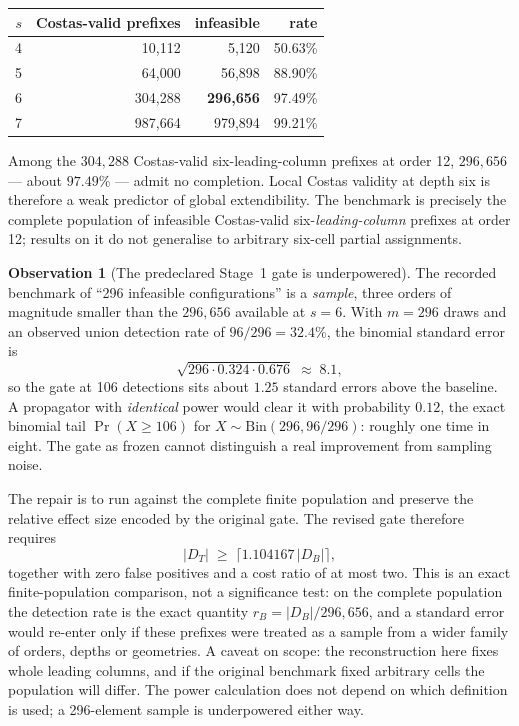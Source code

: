 \documentclass[11pt,a4paper,oneside]{report}
\theoremstyle{definition}
\newtheorem{observation}[theorem]{Observation}
\begin{document}
\begin{center}
\begin{tabular}{@{}rrrr@{}}
\toprule
$s$ & Costas-valid prefixes & infeasible & rate \\
\midrule
4 & 10{,}112 & 5{,}120 & 50.63\% \\
5 & 64{,}000 & 56{,}898 & 88.90\% \\
6 & 304{,}288 & \textbf{296{,}656} & 97.49\% \\
7 & 987{,}664 & 979{,}894 & 99.21\% \\
\bottomrule
\end{tabular}
\end{center}

\noindent Among the $304{,}288$ Costas-valid six-leading-column prefixes at
order 12, $296{,}656$ --- about $97.49\%$ --- admit no completion. Local Costas
validity at depth six is therefore a weak predictor of global extendibility. The
benchmark is precisely the complete population of infeasible Costas-valid
six-\emph{leading-column} prefixes at order 12; results on it do not generalise
to arbitrary six-cell partial assignments.

\begin{observation}[The predeclared Stage~1 gate is underpowered]
\label{p5-obs:gate}
The recorded benchmark of ``296 infeasible configurations'' is a \emph{sample},
three orders of magnitude smaller than the $296{,}656$ available at $s=6$. With
$m=296$ draws and an observed union detection rate of $96/296=32.4\%$, the
binomial standard error is
\[
\sqrt{296\cdot0.324\cdot0.676}\;\approx\;8.1,
\]
so the gate at 106 detections sits about $1.25$ standard errors above the
baseline. A propagator with \emph{identical} power would clear it with probability $0.12$, the exact
binomial tail $\Pr(X\ge106)$ for $X\sim\mathrm{Bin}(296,96/296)$: roughly one time in eight. The gate as frozen cannot distinguish a real improvement from
sampling noise.
\end{observation}

The repair is to run against the complete finite population and preserve the
relative effect size encoded by the original gate. The revised gate therefore
requires
\[
|D_T|\;\ge\;\bigl\lceil 1.104167\,|D_B|\bigr\rceil,
\]
together with zero false positives and a cost ratio of at most two. This is an
exact finite-population comparison, not a significance test: on the complete
population the detection rate is the exact quantity $r_B=|D_B|/296{,}656$, and a
standard error would re-enter only if these prefixes were treated as a sample
from a wider family of orders, depths or geometries. A caveat on scope: the
reconstruction here fixes whole leading columns, and if the original benchmark
fixed arbitrary cells the population will differ. The power calculation does not
depend on which definition is used; a 296-element sample is underpowered either
way.
\end{document}
